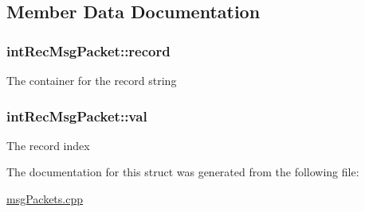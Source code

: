 \subsection{Member Data Documentation}
\hypertarget{structintRecMsgPacket_a4edab3e169d3d5d2ceced40d663e8055}{
\subsubsection[{record}]{\setlength{\rightskip}{0pt plus 5cm}int\-Rec\-Msg\-Packet\-::record}}\label{structintRecMsgPacket_a4edab3e169d3d5d2ceced40d663e8055}
The container for the record string \hypertarget{structintRecMsgPacket_a09009e50e4f452b7fea038fcb5f8e382}{
\subsubsection[{val}]{\setlength{\rightskip}{0pt plus 5cm}int\-Rec\-Msg\-Packet\-::val}}\label{structintRecMsgPacket_a09009e50e4f452b7fea038fcb5f8e382}
The record index 

The documentation for this struct was generated from the following file\-:\begin{DoxyCompactItemize}
\item 
\hyperlink{msgPackets_8cpp}{msg\-Packets.\-cpp}\end{DoxyCompactItemize}
